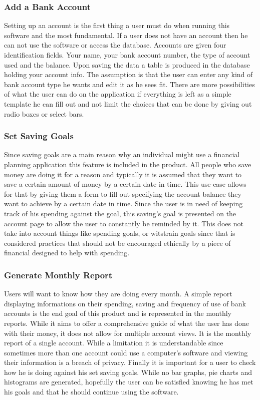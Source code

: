\documentclass{article}
\begin{document}
\subsubsection{Add a Bank Account}
	Setting up an account is the first thing a user must do when running this software and the most fundamental. If a user does not have an account then he can not use the software or access the database. Accounts are given four identification fields. Your name, your bank account number, the type of account used and the balance. Upon saving the data a table is produced in the database holding your account info. The assumption is that the user can enter any kind of bank account type he wants and edit it as he sees fit. There are more possibilities of what the user can do on the application if everything is left as a simple template he can fill out and not limit the choices that can be done by giving out radio boxes or select bars.
\subsubsection{Set Saving Goals}
	Since saving goals are a main reason why an individual might use a financial planning application this feature is included in the product. All people who save money are doing it for a reason and typically it is assumed that they want to save a certain amount of money by a certain date in time. This use-case allows for that by giving them a form to fill out specifying the account balance they want to achieve by a certain date in time. Since the user is in need of keeping track of his spending against the goal, this saving's goal is presented on the account page to allow the user to constantly be reminded by it. This does not take into account things like spending goals, or witstrain goals since that is considered practices that should not be encouraged ethically by a piece of financial designed to help with spending.
\subsubsection{Generate Monthly Report}
	Users will want to know how they are doing every month. A simple report displaying informations on their spending, saving and frequency of use of bank accounts is the end goal of this product and is represented in the monthly reports. While it aims to offer a comprehensive guide of what the user has done with their money, it does not allow for multiple account views. It is the monthly report of a single account. While a limitation it is understandable since sometimes more than one account could use a computer's software and viewing their information is a breach of privacy. Finally it is important for a user to check how he is doing against his set saving goals. While no bar graphs, pie charts and histograms are generated, hopefully the user can be satisfied knowing he has met his goals and that he should continue using the software.
	
\end{document}
